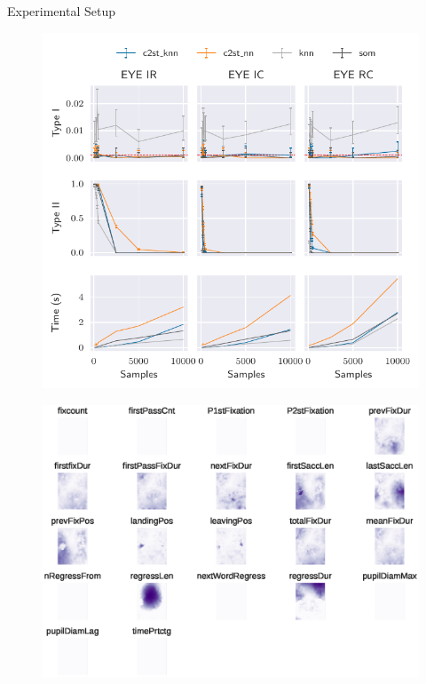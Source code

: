 \documentclass[10pt]{beamer}
\begin{document}
\begin{frame}{Experimental Setup}
    
\end{frame}

\begin{frame}{}
\begin{figure}
    \centering
    \includegraphics[height=\textheight]{eye.pdf}
\end{figure}
\end{frame}

\begin{frame}{}
\begin{figure}
    \centering
    \includegraphics[width=\textwidth]{eye_features.eps}
\end{figure}
\end{frame}
\end{document}
